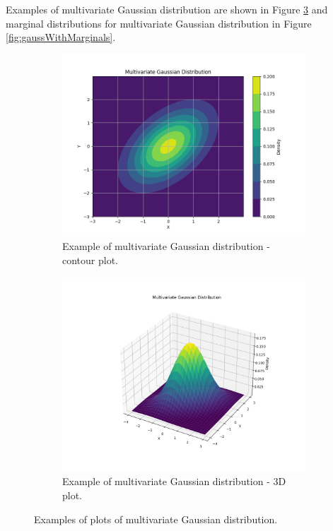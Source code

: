 Examples of multivariate Gaussian distribution are shown in Figure \ref{fig:mvnplot} and marginal distributions for
multivariate Gaussian distribution in Figure \ref{fig:gaussWithMarginals}.
\begin{figure}[htbp]
    \centering
    \begin{subfigure}[b]{0.45\textwidth}
        \centering
        \includegraphics[width=\textwidth]{text/chapter_01/imgs/mvn_contour}
        \caption{Example of multivariate Gaussian distribution - contour plot.}
        \label{fig:mvn_contour}
    \end{subfigure}
    \hfill
    \begin{subfigure}[b]{0.45\textwidth}
        \centering
        \includegraphics[width=\textwidth]{text/chapter_01/imgs/mvn_3d}
        \caption{Example of multivariate Gaussian distribution - 3D plot.}
        \label{fig:mvn_3d}
    \end{subfigure}
    \caption{Examples of plots of multivariate Gaussian distribution.}
    \label{fig:mvnplot}
\end{figure}

